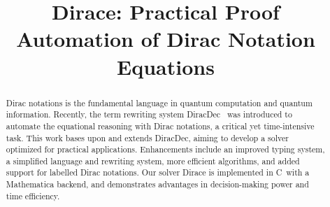 \documentclass[runningheads]{llncs}
\newcommand{\CC}{C\nolinebreak\hspace{-.05em}\raisebox{.4ex}{\tiny\bf +}\nolinebreak\hspace{-.10em}\raisebox{.4ex}{\tiny\bf +}}
\def\CC{{C\nolinebreak[4]\hspace{-.05em}\raisebox{.4ex}{\tiny\bf ++}}}
\begin{document}
%
\title{Dirace: Practical Proof Automation of Dirac Notation Equations}




%
\maketitle              %
%
\begin{abstract}

    Dirac notations is the fundamental language in quantum computation and quantum information. Recently, the term rewriting system DiracDec~\cite{diracdec} was introduced to automate the equational reasoning with Dirac notations, a critical yet time-intensive task. This work bases upon and extends DiracDec, aiming to develop a solver optimized for practical applications. Enhancements include an improved typing system, a simplified language and rewriting system, more efficient algorithms, and added support for labelled Dirac notations. Our solver Dirace is implemented in \CC\ with a Mathematica backend, and demonstrates advantages in decision-making power and time efficiency.


\end{abstract}
%
%
%



\newcommand*{\sem}[1]{{\llbracket #1 \rrbracket}}
\newcommand{\DiracDec}{\textsf{DiracDec}}
\end{document}
